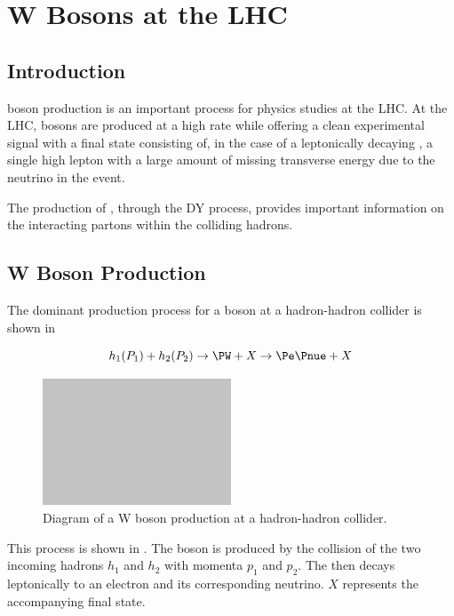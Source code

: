\chapter{W Bosons at the LHC}

\section{Introduction}

\PW boson production is an important process for physics studies at the LHC.  At
the \ac{LHC}, \PW bosons are produced at a high rate while offering a clean
experimental signal with a final state consisting of, in the case of a
leptonically decaying \PW, a single high \PT lepton with a large amount of
missing transverse energy due to the neutrino in the event. 

The production of \PW, through the \ac{DY} process, provides important
information on the interacting partons within the colliding hadrons.

\section{W Boson Production}

The dominant production process for a \PW boson at a hadron-hadron collider is
shown in 

\begin{equation}
  h_1(P_1) + h_2(P_2)
  \to 
  \PW + X
  \to
  \Pe \Pnue + X
  \label{wbos:wprod}
\end{equation}

\begin{figure}[htb]
  \centering
  \includegraphics[width=0.5\textwidth]{placeholder}
  \caption{Diagram of a W boson production at a hadron-hadron collider.}
  \label{wbos:wproddiag}
\end{figure}

This process is shown in . 
The \PW boson is produced by the collision of the two incoming hadrons $h_1$
and $h_2$ with momenta $p_1$ and $p_2$. The \PW then decays leptonically to an
electron and its corresponding neutrino. $X$ represents the accompanying final
state.

